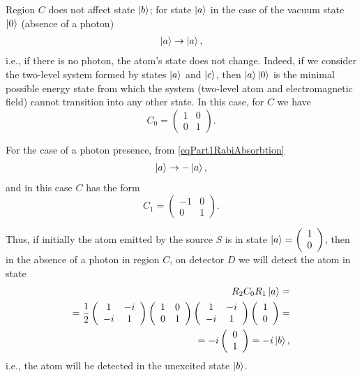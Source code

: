 Region $C$ does not affect state $\ket{b}$; for state $\ket{a}$ in the case of the vacuum state $\ket{0}$ (absence of a photon)
\begin{eqnarray}
  \ket{a} \rightarrow \ket{a},
  \nonumber
\end{eqnarray}
i.e., if there is no photon, the atom's state does not change. Indeed, if we consider the two-level system formed by states $\ket{a}$ and $\ket{c}$, then $\ket{a}\ket{0}$ is the minimal possible energy state from which the system (two-level atom and electromagnetic field) cannot transition into any other state.
In this case, for $C$ we have
\[
C_0 = \left(
\begin{array} {cc}
1 & 0
\\
0 & 1 
\end{array}
\right).
\]

For the case of a photon presence, from \eqref{eqPart1RabiAbsorbtion}
\begin{eqnarray}
  \ket{a} \rightarrow -\ket{a},
  \nonumber
\end{eqnarray}
and in this case $C$ has the form
\[
C_1 = \left(
\begin{array} {cc}
-1 & 0
\\
0 & 1 
\end{array}
\right).
\]

Thus, if initially the atom emitted by the source $S$ is in state $\ket{a} = \left(
\begin{array} {c}
1
\\
0
\end{array}
\right)$, then in the absence of a photon in region $C$, on detector $D$ we will detect the atom in state
\begin{eqnarray}
  R_2 C_0 R_1 \ket{a} =
  \nonumber \\
  =
  \frac{1}{2}
  \left(
  \begin{array} {cc}
    1 & -i
    \\
    -i & 1 
  \end{array}
  \right)
  \left(
  \begin{array} {cc}
    1 & 0
    \\
    0 & 1 
  \end{array}
  \right)
  \left(
  \begin{array} {cc}
    1 & -i
    \\
    -i & 1 
  \end{array}
  \right)
  \left(
  \begin{array} {c}
    1
    \\
    0
  \end{array}
  \right) =
  \nonumber \\
  =
  -i 
  \left(
  \begin{array} {c}
    0
    \\
    1
  \end{array}
  \right) =
  -i \ket{b},
  \nonumber
\end{eqnarray}
i.e., the atom will be detected in the unexcited state
$\ket{b}$.

